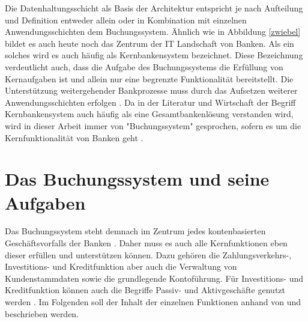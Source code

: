 \documentclass[12pt,oneside,a4paper,parskip]{scrbook}
\begin{document}
Die Datenhaltungsschicht als Basis der Architektur entspricht je nach Aufteilung und Definition entweder allein oder in Kombination mit einzelnen Anwendungsschichten dem Buchungssystem. Ähnlich wie in Abbildung \ref{zwiebel} bildet es auch heute noch das Zentrum der IT Landschaft von Banken. Als ein solches wird es auch häufig als Kernbankensystem bezeichnet. Diese Bezeichnung verdeutlicht auch, dass die Aufgabe des Buchungssystems die Erfüllung von Kernaufgaben ist und allein nur eine begrenzte Funktionalität bereitstellt. Die Unterstützung weitergehender Bankprozesse muss durch das Aufsetzen weiterer Anwendungsschichten erfolgen \cite[58]{ITidF}. Da in der Literatur und Wirtschaft der Begriff Kernbankensystem auch häufig als eine Gesamtbankenlösung verstanden wird, wird in dieser Arbeit immer von "Buchungssystem" gesprochen, sofern es um die Kernfunktionalität von Banken geht \cite{vergleichCoreBanking}.  


\section{Das Buchungssystem und seine Aufgaben}
Das Buchungssystem steht demnach im Zentrum jedes kontenbasierten Geschäftsvorfalls der Banken \cite{bankEnzy}. Daher muss es auch alle Kernfunktionen eben dieser erfüllen und unterstützen können. Dazu gehören die Zahlungsverkehrs-, Investitions- und Kreditfunktion aber auch die Verwaltung von Kundenstammdaten sowie die grundlegende Kontoführung. Für Investitions- und Kreditfunktion können auch die Begriffe Passiv- und Aktivgeschäfte genutzt werden \cite[12, 86]{DdF}\cite{einfuehrungKernbanksystem}. Im Folgenden soll der Inhalt der einzelnen Funktionen anhand von \cite[69-88]{DdF} und \cite[91-153]{bankwirtschaft} beschrieben werden.
\end{document}
